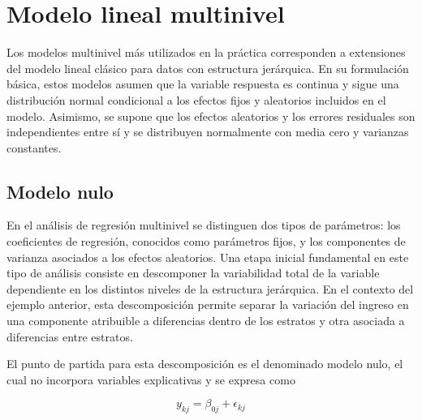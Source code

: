 \documentclass[
  spanish,
  12pt,
]{book}
\newenvironment{Shaded}{\begin{snugshade}}{\end{snugshade}}
\newcommand{\AttributeTok}[1]{\textcolor[rgb]{0.13,0.29,0.53}{#1}}
\newcommand{\FunctionTok}[1]{\textcolor[rgb]{0.13,0.29,0.53}{\textbf{#1}}}
\newcommand{\NormalTok}[1]{#1}
\newcommand{\OtherTok}[1]{\textcolor[rgb]{0.56,0.35,0.01}{#1}}
\newcommand{\SpecialCharTok}[1]{\textcolor[rgb]{0.81,0.36,0.00}{\textbf{#1}}}
\begin{document}
\begin{Shaded}
\end{Shaded}

\section{Modelo lineal multinivel}\label{modelo-lineal-multinivel}

Los modelos multinivel más utilizados en la práctica corresponden a extensiones del modelo lineal clásico para datos con estructura jerárquica. En su formulación básica, estos modelos asumen que la variable respuesta es continua y sigue una distribución normal condicional a los efectos fijos y aleatorios incluidos en el modelo. Asimismo, se supone que los efectos aleatorios y los errores residuales son independientes entre sí y se distribuyen normalmente con media cero y varianzas constantes.

\subsection{Modelo nulo}\label{sec-multinivel-muestras-complejas}

En el análisis de regresión multinivel se distinguen dos tipos de parámetros: los coeficientes de regresión, conocidos como parámetros fijos, y los componentes de varianza asociados a los efectos aleatorios. Una etapa inicial fundamental en este tipo de análisis consiste en descomponer la variabilidad total de la variable dependiente en los distintos niveles de la estructura jerárquica. En el contexto del ejemplo anterior, esta descomposición permite separar la variación del ingreso en una componente atribuible a diferencias dentro de los estratos y otra asociada a diferencias entre estratos.

El punto de partida para esta descomposición es el denominado modelo nulo, el cual no incorpora variables explicativas y se expresa como

\[
y_{kj} = \beta_{0j} + \epsilon_{kj}
\]
\end{document}
